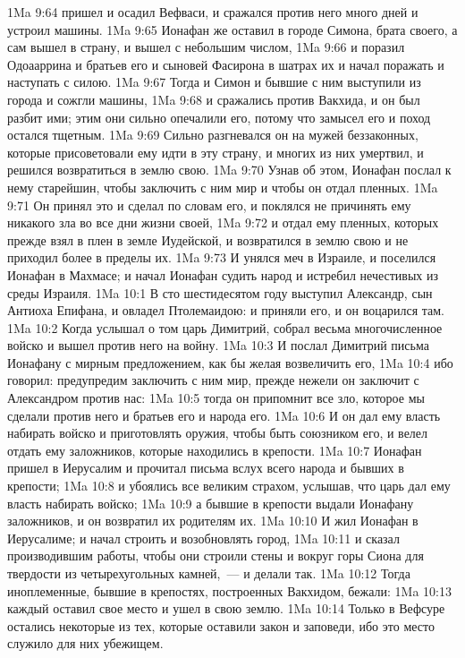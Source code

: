 \vs 1Ma 9:64 пришел и осадил Вефваси, и сражался против него много дней и устроил машины.
\vs 1Ma 9:65 Ионафан же оставил в городе Симона, брата своего, а сам вышел в страну, и вышел с небольшим числом,
\vs 1Ma 9:66 и поразил Одоааррина и братьев его и сыновей Фасирона в шатрах их и начал поражать и наступать с силою.
\vs 1Ma 9:67 Тогда и Симон и бывшие с ним выступили из города и сожгли машины,
\vs 1Ma 9:68 и сражались против Вакхида, и он был разбит ими; этим они сильно опечалили его, потому что замысел его и поход остался тщетным.
\vs 1Ma 9:69 Сильно разгневался он на мужей беззаконных, которые присоветовали ему идти в эту страну, и многих из них умертвил, и решился возвратиться в землю свою.
\vs 1Ma 9:70 Узнав об этом, Ионафан послал к нему старейшин, чтобы заключить с ним мир и чтобы он отдал пленных.
\vs 1Ma 9:71 Он принял это и сделал по словам его, и поклялся не причинять ему никакого зла во все дни жизни своей,
\vs 1Ma 9:72 и отдал ему пленных, которых прежде взял в плен в земле Иудейской, и возвратился в землю свою и не приходил более в пределы их.
\vs 1Ma 9:73 И унялся меч в Израиле, и поселился Ионафан в Махмасе; и начал Ионафан судить народ и истребил нечестивых из среды Израиля.
\vs 1Ma 10:1 В сто шестидесятом году выступил Александр, сын Антиоха Епифана, и овладел Птолемаидою: и приняли его, и он воцарился там.
\vs 1Ma 10:2 Когда услышал о том царь Димитрий, собрал весьма многочисленное войско и вышел против него на войну.
\vs 1Ma 10:3 И послал Димитрий письма Ионафану с мирным предложением, как бы желая возвеличить его,
\vs 1Ma 10:4 ибо говорил: предупредим заключить с ним мир, прежде нежели он заключит с Александром против нас:
\vs 1Ma 10:5 тогда он припомнит все зло, которое мы сделали против него и братьев его и народа его.
\vs 1Ma 10:6 И он дал ему власть набирать войско и приготовлять оружия, чтобы быть союзником его, и велел отдать ему заложников, которые находились в крепости.
\vs 1Ma 10:7 Ионафан пришел в Иерусалим и прочитал письма вслух всего народа и бывших в крепости;
\vs 1Ma 10:8 и убоялись все великим страхом, услышав, что царь дал ему власть набирать войско;
\vs 1Ma 10:9 а бывшие в крепости выдали Ионафану заложников, и он возвратил их родителям их.
\vs 1Ma 10:10 И жил Ионафан в Иерусалиме; и начал строить и возобновлять город,
\vs 1Ma 10:11 и сказал производившим работы, чтобы они строили стены и вокруг горы Сиона для твердости из четырехугольных камней,~--- и делали так.
\vs 1Ma 10:12 Тогда иноплеменные, бывшие в крепостях, построенных Вакхидом, бежали:
\vs 1Ma 10:13 каждый оставил свое место и ушел в свою землю.
\vs 1Ma 10:14 Только в Вефсуре остались некоторые из тех, которые оставили закон и заповеди, ибо это место служило для них убежищем.
